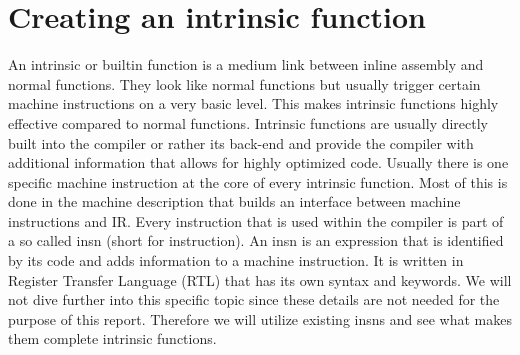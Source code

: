 \chapter{Creating an intrinsic function}
\label{chapter:builtins}

An intrinsic or builtin function is a medium link between inline assembly and normal functions. They look like normal functions but usually trigger certain machine instructions on a very basic level. This makes intrinsic functions highly effective compared to normal functions. Intrinsic functions are usually directly built into the compiler or rather its back-end and provide the compiler with additional information that allows for highly optimized code. Usually there is one specific machine instruction at the core of every intrinsic function.
Most of this is done in the machine description that builds an interface between machine instructions and IR. Every instruction that is used within the compiler is part of a so called insn (short for instruction). An insn is an expression that is identified by its code and adds information to a machine instruction. It is written in Register Transfer Language (RTL) that has its own syntax and keywords.
We will not dive further into this specific topic since these details are not needed for the purpose of this report. Therefore we will utilize existing insns and see what makes them complete intrinsic functions.

